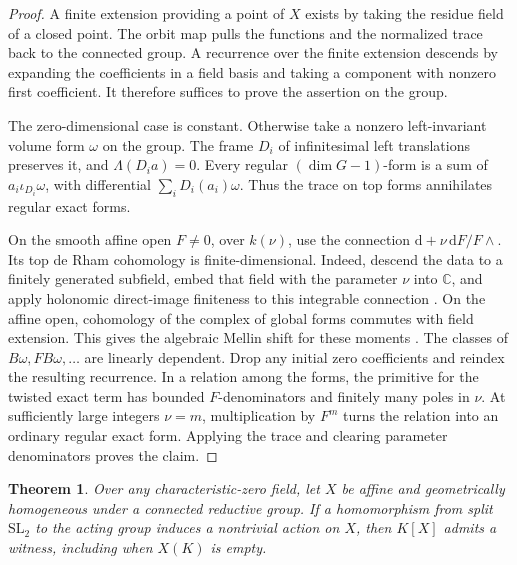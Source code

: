 \documentclass[11pt]{article}
\newtheorem{theorem}{Theorem}[section]
\newcommand{\CC}{\mathbb C}
\newcommand{\SL}{\mathrm{SL}}
\begin{document}
\begin{proof}
A finite extension providing a point of \(X\) exists by taking the
residue field of a closed point. The orbit map pulls the functions
and the normalized trace back to the connected group. A recurrence
over the finite extension descends by expanding the coefficients
in a field basis and taking a component with nonzero first coefficient.
It therefore suffices to prove the assertion on the group.

The zero-dimensional case is constant. Otherwise take a nonzero
left-invariant volume form \(\omega\) on the group.
The frame \(D_i\) of infinitesimal left translations preserves it, and
\(\Lambda(D_i a)=0\). Every regular \((\dim G-1)\)-form is a sum of
\(a_i\iota_{D_i}\omega\), with differential \(\sum_i D_i(a_i)\omega\).
Thus the trace on top forms annihilates regular exact forms.

On the smooth affine open \(F\ne0\), over \(k(\nu)\), use the
connection \(\mathrm d+\nu\,\mathrm dF/F\wedge\). Its top de Rham
cohomology is finite-dimensional. Indeed, descend the data to a finitely
generated subfield, embed that field with the parameter \(\nu\) into
\(\CC\), and apply holonomic direct-image finiteness to this integrable
connection \cite[Theorem~3.2.3]{HTT}. On the affine open, cohomology of
the complex of global forms commutes with field extension.
This gives the algebraic Mellin shift for these moments
\cite[Section~1.3]{LoeserSabbah}. The classes
of \(B\omega,FB\omega,\ldots\) are linearly dependent. Drop any initial
zero coefficients and reindex the resulting recurrence. In a relation
among the forms, the primitive for the twisted exact term has bounded
\(F\)-denominators and finitely many poles in \(\nu\). At sufficiently
large integers \(\nu=m\), multiplication by \(F^m\) turns the
relation into an ordinary regular exact form. Applying the trace
and clearing parameter denominators proves the claim.
\end{proof}

\begin{theorem}\label{thm:active}
Over any characteristic-zero field, let \(X\) be affine and geometrically
homogeneous under a connected reductive group. If a homomorphism from
split \(\SL_2\) to the acting group induces a nontrivial action on \(X\),
then \(K[X]\) admits a witness, including when \(X(K)\) is empty.
\end{theorem}
\end{document}
